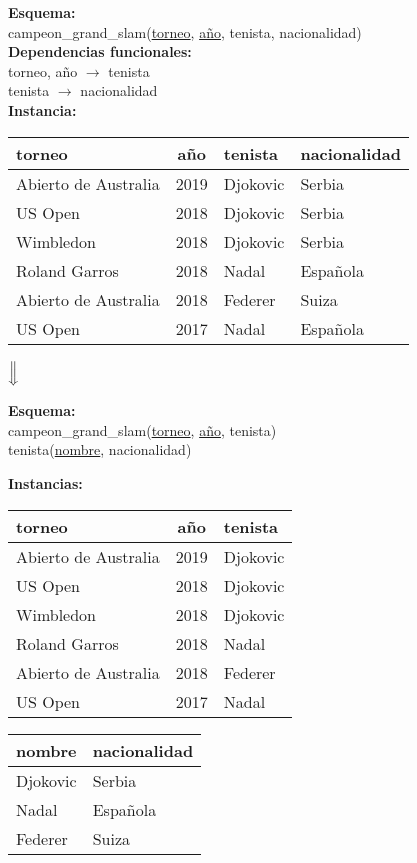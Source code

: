 \documentclass[preview]{standalone}
\begin{document}
\textbf{Esquema:}\\
campeon\_grand\_slam(\underline{torneo}, \underline{a\~no}, tenista, nacionalidad)\\

\textbf{Dependencias funcionales:}\\
torneo, a\~no $\rightarrow$ tenista\\
tenista $\rightarrow$ nacionalidad\\

\textbf{Instancia:}
\begin{center}
\scriptsize
\begin{tabular}{| l | c | l | l |}\hline			
	torneo & a\~no & tenista & nacionalidad  \\\hline			
	Abierto de Australia & 2019 & Djokovic & Serbia \\
	US Open & 2018 & Djokovic & Serbia \\
	Wimbledon & 2018 & Djokovic & Serbia \\
	Roland Garros & 2018 & Nadal & Espa\~nola \\
	Abierto de Australia & 2018 & Federer & Suiza \\
	US Open & 2017 & Nadal & Espa\~nola \\\hline
\end{tabular}



$\Big\Downarrow$
\end{center}

\textbf{Esquema:}\\
campeon\_grand\_slam(\underline{torneo}, \underline{a\~no}, tenista)\\
tenista(\underline{nombre}, nacionalidad)


\textbf{Instancias:}
\begin{center}
\scriptsize
\begin{tabular}{| l | c | l |}\hline			
	torneo & a\~no & tenista \\\hline			
	Abierto de Australia & 2019 & Djokovic \\
	US Open & 2018 & Djokovic \\
	Wimbledon & 2018 & Djokovic \\
	Roland Garros & 2018 & Nadal \\
	Abierto de Australia & 2018 & Federer \\
	US Open & 2017 & Nadal \\\hline
\end{tabular}
\quad
\begin{tabular}{| l | l |}\hline			
	nombre & nacionalidad \\\hline	
	Djokovic & Serbia\\		
	Nadal & Espa\~nola\\		
	Federer & Suiza\\\hline		
\end{tabular}
\end{center}
\end{document}
